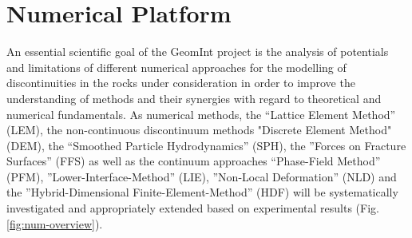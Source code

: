 \chapter{Numerical Platform}
\label{cha:num}
An essential scientific goal of the GeomInt project is the analysis of potentials and limitations of different numerical approaches for the modelling of discontinuities in the rocks under consideration in order to improve the understanding of methods and their synergies with regard to theoretical and numerical fundamentals. As numerical methods, 
the ``Lattice Element Method'' (LEM),
the non-continuous discontinuum methods "Discrete Element Method" (DEM),
the ``Smoothed Particle Hydrodynamics'' (SPH),
the ''Forces on Fracture Surfaces'' (FFS) 
as well as the continuum approaches ``Phase-Field Method'' (PFM), ''Lower-Interface-Method'' (LIE), ''Non-Local Deformation'' (NLD) and the ''Hybrid-Dimensional Finite-Element-Method'' (HDF) will be systematically investigated and appropriately extended based on experimental results (Fig. \ref{fig:num-overview}).

